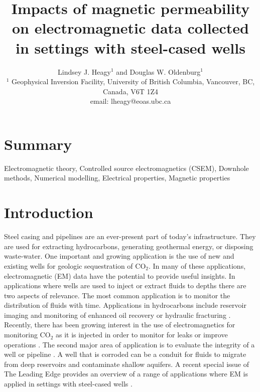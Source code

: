 \documentclass[onecolumn, extra, mreferee]{gji}
\title[EM with conductive, permeable wells]{
  Impacts of magnetic permeability on electromagnetic data collected in settings with steel-cased wells
}
\author[L. J. Heagy and D. W. Oldenburg]{
  Lindsey J. Heagy$^1$ and Douglas W. Oldenburg$^1$\\
  $^1$ Geophysical Inversion Facility, University of British Columbia, Vancouver, BC, Canada, V6T 1Z4
  \\ \quad email: lheagy@eoas.ubc.ca
}
\begin{document}
\label{firstpage}

\maketitle

\section*{Summary}


\begin{keywords}
Electromagnetic theory, Controlled source electromagnetics (CSEM), Downhole methods, Numerical modelling, Electrical properties, Magnetic properties
\end{keywords}


\section{Introduction}

Steel casing and pipelines are an ever-present part of today's infrastructure. They are used for extracting hydrocarbons, generating geothermal energy, or disposing waste-water. One important and growing application is the use of new and existing wells for geologic sequestration of CO$_2$. In many of these applications, electromagnetic (EM) data have the potential to provide useful insights. In applications where wells are used to inject or extract fluids to depths there are two aspects of relevance. The most common application is to monitor the distribution of fluids with time. Applications in hydrocarbons include reservoir imaging and monitoring of enhanced oil recovery or hydraulic fracturing \citep{Rocroi1985, Pardo2008a, tang_three-dimensional_2015, hoversten_hydro-frac_2015, Tietze2015}. Recently, there has been growing interest in the use of electromagnetics for monitoring CO$_2$ as it is injected in order to monitor for leaks or improve operations \citep{carrigan_electrical_2013, park_25d_2017, puzyrev_three-dimensional_2017, um_joint_2020}. The second major area of application is to evaluate the integrity of a well or pipeline \cite{wilt_casing_2020, beskardes_effects_2021}. A well that is corroded can be a conduit for fluids to migrate from deep reservoirs and contaminate shallow aquifers. A recent special issue of The Leading Edge provides an overview of a range of applications where EM is applied in settings with steel-cased wells \citep{weiss_introduction_2022}.
\end{document}
